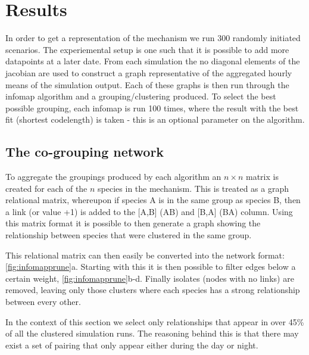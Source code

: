 %


\section{Results}

In order to get a representation of the mechanism we run 300 randomly initiated scenarios. The experiemental setup is one such that it is possible to add more datapoints at a later date. From each simulation the no diagonal elements of the jacobian are used to construct a graph representative of the aggregated hourly means of the simulation output. Each of these graphs is then run through the infomap algorithm and a grouping/clustering produced. To select the best possible grouping, each infomap is run 100 times, where the result with the best fit (shortest codelength) is taken - this is an optional parameter on the algorithm.

\subsection{The co-grouping network}

To aggregate the groupings produced by each algorithm an $n\times n$ matrix is created for each of the $n$ species in the mechanism. This is treated as a graph relational matrix, whereupon if species A is in the same group as species B, then a link (or value +1) is added to the [A,B] (A\ce{->}B) and [B,A] (B\ce{->}A) column. Using this matrix format it is possible to then generate a graph showing the relationship between species that were clustered in the same group.

This relational matrix can then easily be converted into the network format: \autoref{fig:infomapprune}a. Starting with this it is then possible to filter edges below a certain weight, \autoref{fig:infomapprune}b-d. Finally isolates (nodes with no links) are removed, leaving only those clusters where each species has a strong relationship between every other. 

In the context of this section we select only relationships that appear in over 45\% of all the clustered simulation runs. The reasoning behind this is that there may exist a set of pairing that only appear either during the day or night.  

